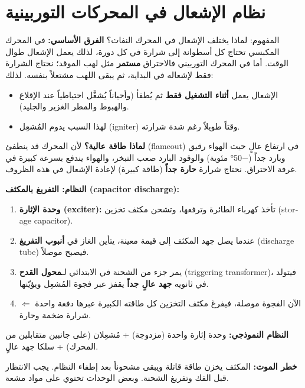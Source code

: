 \documentclass[11pt,a4paper]{article}
\newcommand{\en}[1]{\textenglish{#1}}
\begin{document}
\newpage
\section{نظام الإشعال في المحركات التوربينية}

\begin{concept}{المفهوم: لماذا يختلف الإشعال في المحرك النفاث؟}
\textbf{الفرق الأساسي:} في المحرك المكبسي تحتاج كل أسطوانة إلى شرارة في كل دورة، لذلك يعمل الإشعال طوال الوقت. أما في المحرك التوربيني فالاحتراق \textbf{مستمر} مثل لهب الموقد؛ نحتاج الشرارة فقط لإشعاله في البداية، ثم يبقى اللهب مشتعلاً بنفسه. لذلك:
\begin{itemize}
  \item الإشعال يعمل \textbf{أثناء التشغيل فقط} ثم يُطفأ (وأحياناً يُشغَّل احتياطياً عند الإقلاع والهبوط والمطر الغزير والجليد).
  \item لهذا السبب يدوم المُشعِل (\en{igniter}) وقتاً طويلاً رغم شدة شرارته.
\end{itemize}
\textbf{لماذا طاقة عالية؟} لأن المحرك قد ينطفئ (\en{flameout}) في ارتفاع عالٍ حيث الهواء رقيق وبارد جداً (−50° مئوية) والوقود البارد صعب التبخر، والهواء يندفع بسرعة كبيرة في غرفة الاحتراق. نحتاج شرارة \textbf{حارة جداً} (طاقة كبيرة) لإعادة الإشعال في هذه الظروف.

\textbf{النظام: التفريغ بالمكثف (\en{capacitor discharge}):}
\begin{enumerate}[label=\arabic*.]
  \item \textbf{وحدة الإثارة (\en{exciter}):} تأخذ كهرباء الطائرة وترفعها، وتشحن مكثف تخزين (\en{storage capacitor}).
  \item عندما يصل جهد المكثف إلى قيمة معينة، يتأين الغاز في \textbf{أنبوب التفريغ} (\en{discharge tube}) فيصبح موصلاً.
  \item يمر جزء من الشحنة في الابتدائي لـ\textbf{محول القدح} (\en{triggering transformer})، فيتولد في ثانويه \textbf{جهد عالٍ جداً} يقفز عبر فجوة المُشعِل ويؤيّنها.
  \item الآن الفجوة موصلة، فيفرغ مكثف التخزين كل طاقته الكبيرة عبرها دفعة واحدة $\Leftarrow$ شرارة ضخمة وحارة.
\end{enumerate}
\textbf{النظام النموذجي:} وحدة إثارة واحدة (مزدوجة) + مُشعِلان (على جانبين متقابلين من المحرك) + سلكا جهد عالٍ.

\textbf{خطر الموت:} المكثف يخزن طاقة قاتلة ويبقى مشحوناً بعد إطفاء النظام. يجب الانتظار قبل الفك وتفريغ الشحنة. وبعض الوحدات تحتوي على مواد مشعة.
\end{concept}
\end{document}
